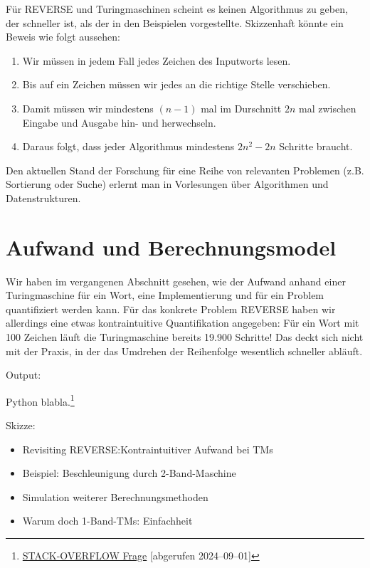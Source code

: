 Für REVERSE und Turingmaschinen scheint es keinen Algorithmus zu geben,
der schneller ist, als der in den Beispielen vorgestellte.
Skizzenhaft könnte ein Beweis wie folgt aussehen:
\begin{enumerate}
        \item Wir müssen in jedem Fall jedes Zeichen des Inputworts lesen.
        \item Bis auf ein Zeichen müssen wir jedes an die richtige Stelle verschieben.
        \item Damit müssen wir mindestens $(n-1)$ mal im Durschnitt $2n$ mal
            zwischen Eingabe und Ausgabe hin- und herwechseln.
        \item Daraus folgt, dass jeder Algorithmus mindestens $2n^2 - 2n$ Schritte braucht.
\end{enumerate}

Den aktuellen Stand der Forschung für eine Reihe von relevanten Problemen
(z.B. Sortierung oder Suche) erlernt man in Vorlesungen über
Algorithmen und Datenstrukturen.



\section{Aufwand und Berechnungsmodel}

Wir haben im vergangenen Abschnitt gesehen,
wie der Aufwand anhand einer Turingmaschine für ein Wort,
eine Implementierung und für ein Problem quantifiziert werden kann.
Für das konkrete Problem REVERSE haben wir allerdings eine etwas kontraintuitive Quantifikation angegeben:
Für ein Wort mit 100 Zeichen läuft die Turingmaschine bereits 19.900 Schritte!
Das deckt sich nicht mit der Praxis,
in der das Umdrehen der Reihenfolge wesentlich schneller abläuft.

\label{lst:reverse}

Output:

Python blabla.\footnote{%
    \href{https://stackoverflow.com/questions/52294373/how-to-find-the-implementation-of-1-reversing-list-in-python-in-cpython}{STACK-OVERFLOW Frage} [abgerufen 2024--09--01]
}

Skizze:
\begin{itemize}
        \item Revisiting REVERSE:\@ Kontraintuitiver Aufwand bei TMs
        \item Beispiel: Beschleunigung durch 2-Band-Maschine
        \item Simulation weiterer Berechnungsmethoden
        \item Warum doch 1-Band-TMs: Einfachheit
\end{itemize}


